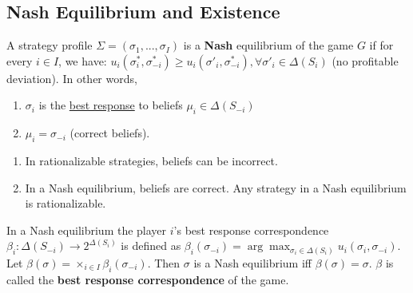 \documentclass[11pt]{elegantbook_2}
\begin{document}
\subsection{Nash Equilibrium and Existence}
\begin{definition}
    A strategy profile $\Sigma=(\sigma_1,...,\sigma_I)$ is a \textbf{Nash} equilibrium of the game $G$ if for every $i\in I$, we have: $u_i(\sigma^*_i,\sigma^*_{-i})\geq u_i(\sigma'_i,\sigma^*_{-i}), \forall \sigma'_i\in \Delta(S_i)$ (no profitable deviation). In other words,
    \begin{enumerate}
        \item $\sigma_i$ is the \underline{best response} to beliefs $\mu_i\in \Delta (S_{-i})$
        \item $\mu_i=\sigma_{-i}$ (correct beliefs).
    \end{enumerate}
\end{definition}
\begin{enumerate}
    \item In rationalizable strategies, beliefs can be incorrect.
    \item In a Nash equilibrium, beliefs are correct. Any strategy in a Nash equilibrium is rationalizable.
\end{enumerate}

\begin{definition}
    In a Nash equilibrium the player $i$'s best response correspondence $\beta_i:\Delta(S_{-i})\rightarrow 2^{\Delta(S_i)}$ is defined as $\beta_i(\sigma_{-i})=\arg\max_{\sigma_i\in\Delta(S_i)}u_i(\sigma_i,\sigma_{-i})$. Let $\beta(\sigma)=\times_{i\in I}\beta_i(\sigma_{-i})$. Then $\sigma$ is a Nash equilibrium iff $\beta(\sigma)=\sigma$. $\beta$ is called the \textbf{best response correspondence} of the game.
\end{definition}
\end{document}
